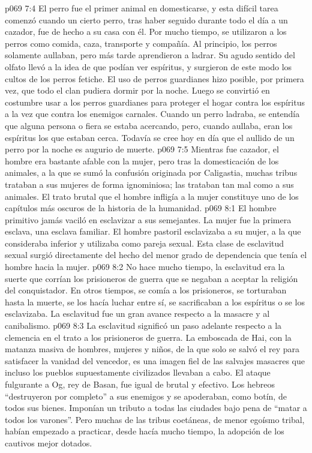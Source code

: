 \vs p069 7:4 El perro fue el primer animal en domesticarse, y esta difícil tarea comenzó cuando un cierto perro, tras haber seguido durante todo el día a un cazador, fue de hecho a su casa con él. Por mucho tiempo, se utilizaron a los perros como comida, caza, transporte y compañía. Al principio, los perros solamente aullaban, pero más tarde aprendieron a ladrar. Su agudo sentido del olfato llevó a la idea de que podían ver espíritus, y surgieron de este modo los cultos de los perros fetiche. El uso de perros guardianes hizo posible, por primera vez, que todo el clan pudiera dormir por la noche. Luego se convirtió en costumbre usar a los perros guardianes para proteger el hogar contra los espíritus a la vez que contra los enemigos carnales. Cuando un perro ladraba, se entendía que alguna persona o fiera se estaba acercando, pero, cuando aullaba, eran los espíritus los que estaban cerca. Todavía se cree hoy en día que el aullido de un perro por la noche es augurio de muerte.
\vs p069 7:5 Mientras fue cazador, el hombre era bastante afable con la mujer, pero tras la domesticación de los animales, a la que se sumó la confusión originada por Caligastia, muchas tribus trataban a sus mujeres de forma ignominiosa; las trataban tan mal como a sus animales. El trato brutal que el hombre infligía a la mujer constituye uno de los capítulos más oscuros de la historia de la humanidad.
\vs p069 8:1 El hombre primitivo jamás vaciló en esclavizar a sus semejantes. La mujer fue la primera esclava, una esclava familiar. El hombre pastoril esclavizaba a su mujer, a la que consideraba inferior y utilizaba como pareja sexual. Esta clase de esclavitud sexual surgió directamente del hecho del menor grado de dependencia que tenía el hombre hacia la mujer.
\vs p069 8:2 No hace mucho tiempo, la esclavitud era la suerte que corrían los prisioneros de guerra que se negaban a aceptar la religión del conquistador. En otros tiempos, se comía a los prisioneros, se torturaban hasta la muerte, se los hacía luchar entre sí, se sacrificaban a los espíritus o se los esclavizaba. La esclavitud fue un gran avance respecto a la masacre y al canibalismo.
\vs p069 8:3 La esclavitud significó un paso adelante respecto a la clemencia en el trato a los prisioneros de guerra. La emboscada de Hai, con la matanza masiva de hombres, mujeres y niños, de la que solo se salvó el rey para satisfacer la vanidad del vencedor, es una imagen fiel de las salvajes masacres que incluso los pueblos supuestamente civilizados llevaban a cabo. El ataque fulgurante a Og, rey de Basan, fue igual de brutal y efectivo. Los hebreos “destruyeron por completo” a sus enemigos y se apoderaban, como botín, de todos sus bienes. Imponían un tributo a todas las ciudades bajo pena de “matar a todos los varones”. Pero muchas de las tribus coetáneas, de menor egoísmo tribal, habían empezado a practicar, desde hacía mucho tiempo, la adopción de los cautivos mejor dotados.
